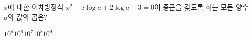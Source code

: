 $x$에 대한 이차방정식 $x^2-x\log a+2\log a-3=0$이 중근을 갖도록 하는 모든 양수 $a$의 값의 곱은?
\begin{choices32}{$10^5$}{$10^6$}{$10^7$}{$10^8$}{$10^9$}\end{choices32}

